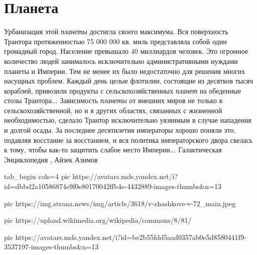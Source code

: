  
 
 
 
 
\chapter{Планета}

Урбанизация этой \emph{планеты} достигла своего максимума. Вся поверхность Трантора
протяженностью 75 000 000 кв. миль представляла собой один громадный город.
Население превышало 40 миллиардов человек. Это огромное количество людей
занималось исключительно административными нуждами планеты и Империи. Тем не
менее их было недостаточно для решения многих насущных проблем. Каждый день
целые флотилии, состоящие из десятков тысяч кораблей, привозили продукты с
сельскохозяйственных \emph{планет} на обеденные столы Трантора...
Зависимость \emph{планеты} от внешних миров не только в сельскохозяйственной,
но и в других областях, связанных с жизненной необходимостью, сделало Трантор
исключительно уязвимым в случае нападения и долгой осады. За последнее
десятилетия императоры хорошо поняли это, подавляя восстание за восстанием, и
вся политика императорского двора свелась к тому, чтобы как-то защитить слабое
место Империи... Галактическая Энциклопедия
, Айзек Азимов

\ifcmt
  tab_begin cols=4
		 pic https://avatars.mds.yandex.net/i?id=dbbd2a10586874e9f0e80170042ffb4e-4432889-images-thumbs&n=13

     pic https://img.strana.news/img/article/3618/v-zhashkove-v-72_main.jpeg

     pic https://upload.wikimedia.org/wikipedia/commons/8/81/%

		 pic https://avatars.mds.yandex.net/i?id=be2b55fdd5aad0357ab0e5d8580441f9-3537197-images-thumbs&n=13

